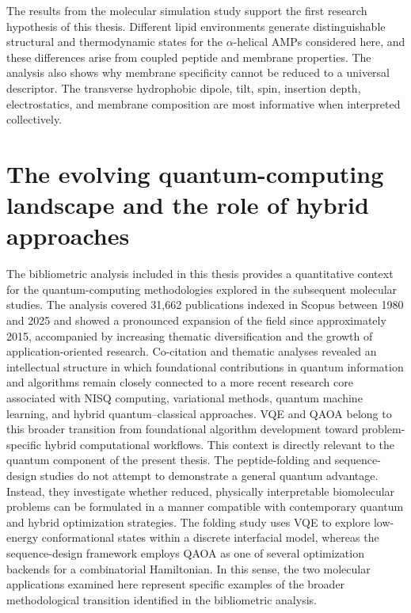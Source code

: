 The results from the molecular simulation study support the first research hypothesis of this thesis. Different lipid environments generate distinguishable structural and thermodynamic states for the $\alpha$-helical AMPs considered here, and these differences arise from coupled peptide and membrane properties. The analysis also shows why membrane specificity cannot be reduced to a universal descriptor. The transverse hydrophobic dipole, tilt, spin, insertion depth, electrostatics, and membrane composition are most informative when interpreted collectively.

\section{The evolving quantum-computing landscape and the role of hybrid approaches}

The bibliometric analysis included in this thesis provides a quantitative context for the quantum-computing methodologies explored in the subsequent molecular studies. The analysis covered 31,662 publications indexed in Scopus between 1980 and 2025 and showed a pronounced expansion of the field since approximately 2015, accompanied by increasing thematic diversification and the growth of application-oriented research. 
Co-citation and thematic analyses revealed an intellectual structure in which foundational contributions in quantum information and algorithms remain closely connected to a more recent research core associated with NISQ computing, variational methods, quantum machine learning, and hybrid quantum–classical approaches. VQE and QAOA belong to this broader transition from foundational algorithm development toward problem-specific hybrid computational workflows. 
This context is directly relevant to the quantum component of the present thesis. The peptide-folding and sequence-design studies do not attempt to demonstrate a general quantum advantage. Instead, they investigate whether reduced, physically interpretable biomolecular problems can be formulated in a manner compatible with contemporary quantum and hybrid optimization strategies. The folding study uses VQE to explore low-energy conformational states within a discrete interfacial model, whereas the sequence-design framework employs QAOA as one of several optimization backends for a combinatorial Hamiltonian. In this sense, the two molecular applications examined here represent specific examples of the broader methodological transition identified in the bibliometric analysis.


